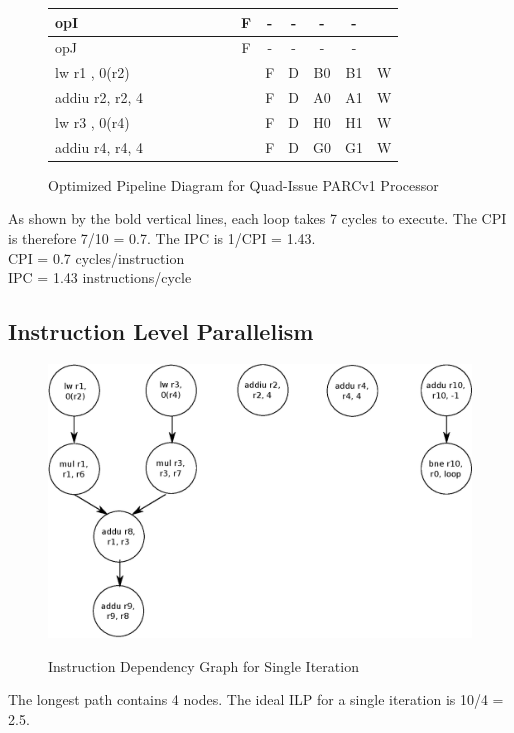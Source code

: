 \documentclass[10pt]{article}
\begin{document}
\begin{figure}[H]
{\begin{tabular}{|l|c|c|c|c!{\vrule width 1.5pt}c|c|c|c|c|c|c!{\vrule width 1.5pt}c|}
opI               &    &    &    &    &    &    & F  & -  & -  & -  & -  &    \\ \hline
opJ               &    &    &    &    &    &    & F  & -  & -  & -  & -  &    \\ \hline
lw r1 , 0(r2)     &    &    &    &    &    &    &    & F  & D  & B0 & B1 & W  \\ \hline
addiu r2, r2, 4   &    &    &    &    &    &    &    & F  & D  & A0 & A1 & W  \\ \hline
lw r3 , 0(r4)     &    &    &    &    &    &    &    & F  & D  & H0 & H1 & W  \\ \hline
addiu r4, r4, 4   &    &    &    &    &    &    &    & F  & D  & G0 & G1 & W  \\ \hline
\end{tabular}
}
\caption{Optimized Pipeline Diagram for Quad-Issue PARCv1 Processor}
\end{figure}

As shown by the bold vertical lines, each loop takes 7 cycles to execute. The CPI is therefore 7/10 = 0.7. The IPC is 1/CPI = 1.43.\\
CPI = 0.7 cycles/instruction\\
IPC = 1.43 instructions/cycle

\subsection{Instruction Level Parallelism}

\begin{figure}[H]
\begin{center}
\includegraphics[scale=0.5]{singleiteri.eps}
\label{default}
\end{center}
\caption{Instruction Dependency Graph for Single Iteration}
\end{figure}
The longest path contains 4 nodes.
The ideal ILP for a single iteration is 10/4 = 2.5.
\end{document}

